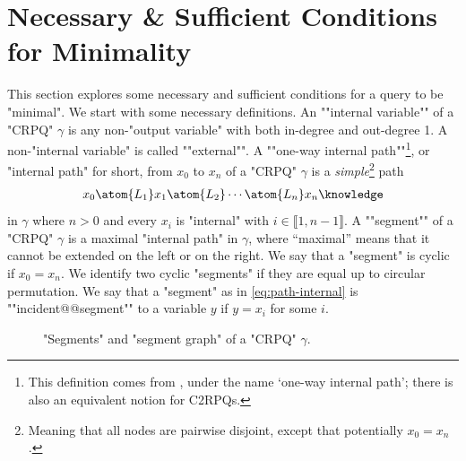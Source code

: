 \section{Necessary \& Sufficient Conditions for Minimality}

This section explores some necessary and sufficient conditions for a query to be "minimal".
We start with some necessary definitions.
\AP
An ""internal variable"" of a "CRPQ" $\gamma$ is any non-"output variable" with both in-degree and out-degree 1.
A non-"internal variable" is called \AP""external"".
A \AP""one-way internal path""\footnote{This definition comes from \cite[\S 7]{FM2023semantic}, 
under the name `one-way internal path'; there is also an equivalent
notion for C2RPQs.}, or "internal path" for short, from $x_0$ to $x_n$ of a "CRPQ" $\gamma$ is a \emph{simple}\footnote{Meaning that all nodes are pairwise disjoint,
except that potentially $x_0 = x_n$.} path
\begin{align}
	x_0 \atom{L_1} x_1 \atom{L_2} \cdots \atom{L_n} x_n 
	\AP\label{eq:path-internal}
\end{align}
in $\gamma$ where $n > 0$ and every $x_i$ is "internal" with $i \in \lBrack 1,n-1\rBrack$.
A \AP""segment"" of a "CRPQ" $\gamma$ is a maximal "internal 
path" in $\gamma$, where ``maximal'' means that it cannot be extended on the left
or on the right. We say that a "segment" is cyclic if $x_0 = x_n$.
We identify two cyclic "segments" if they are equal up to circular permutation.
We say that a "segment" as in \eqref{eq:path-internal} is \AP""incident@@segment""
to a variable $y$ if $y = x_i$ for some $i$.

\begin{figure}
	\centering
	\hfill%
	\caption{"Segments" and "segment graph" of a "CRPQ" $\gamma$.}
\end{figure}


